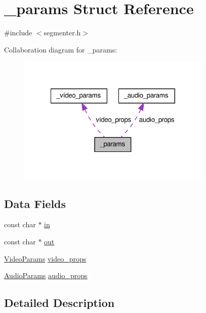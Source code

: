 \hypertarget{struct__params}{\section{\-\_\-params \-Struct \-Reference}
\label{struct__params}
}


{\ttfamily \#include $<$segmenter.\-h$>$}



\-Collaboration diagram for \-\_\-params\-:
\nopagebreak
\begin{figure}[H]
\begin{center}
\leavevmode
\includegraphics[width=263pt]{struct__params__coll__graph}
\end{center}
\end{figure}
\subsection*{\-Data \-Fields}
\begin{DoxyCompactItemize}
\item 
const char $\ast$ \hyperlink{struct__params_a52bb50fce643c4899922808db7d60d42}{in}
\item 
const char $\ast$ \hyperlink{struct__params_a8905de849f303a8598c0f7c3d37d46ed}{out}
\item 
\hyperlink{segmenter_8h_a1666894b15eabe395e38f7239af909b5}{\-Video\-Params} \hyperlink{struct__params_ae8e5c5323efdf97ec1e66866b906f813}{video\-\_\-props}
\item 
\hyperlink{segmenter_8h_aec2d7f32ce7a93dcc3c613460ffb70fc}{\-Audio\-Params} \hyperlink{struct__params_a219b79cb42ef34f697906a8d8366c947}{audio\-\_\-props}
\end{DoxyCompactItemize}


\subsection{\-Detailed \-Description}


